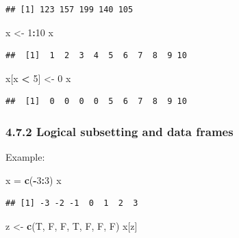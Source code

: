 \documentclass[]{article}
\newenvironment{Shaded}{\begin{snugshade}}{\end{snugshade}}
\newcommand{\KeywordTok}[1]{\textcolor[rgb]{0.13,0.29,0.53}{\textbf{#1}}}
\newcommand{\DecValTok}[1]{\textcolor[rgb]{0.00,0.00,0.81}{#1}}
\newcommand{\StringTok}[1]{\textcolor[rgb]{0.31,0.60,0.02}{#1}}
\newcommand{\OperatorTok}[1]{\textcolor[rgb]{0.81,0.36,0.00}{\textbf{#1}}}
\newcommand{\NormalTok}[1]{#1}
\begin{document}
\begin{verbatim}
## [1] 123 157 199 140 105
\end{verbatim}

\begin{Shaded}
\begin{Highlighting}[]
\NormalTok{x <-}\StringTok{ }\DecValTok{1}\OperatorTok{:}\DecValTok{10}
\NormalTok{x}
\end{Highlighting}
\end{Shaded}

\begin{verbatim}
##  [1]  1  2  3  4  5  6  7  8  9 10
\end{verbatim}

\begin{Shaded}
\begin{Highlighting}[]
\NormalTok{x[x }\OperatorTok{<}\StringTok{ }\DecValTok{5}\NormalTok{] <-}\StringTok{ }\DecValTok{0}
\NormalTok{x}
\end{Highlighting}
\end{Shaded}

\begin{verbatim}
##  [1]  0  0  0  0  5  6  7  8  9 10
\end{verbatim}

\subsubsection{4.7.2 Logical subsetting and data
frames}\label{logical-subsetting-and-data-frames}

Example:

\begin{Shaded}
\begin{Highlighting}[]
\NormalTok{x =}\StringTok{ }\KeywordTok{c}\NormalTok{(}\OperatorTok{-}\DecValTok{3}\OperatorTok{:}\DecValTok{3}\NormalTok{)}
\NormalTok{x}
\end{Highlighting}
\end{Shaded}

\begin{verbatim}
## [1] -3 -2 -1  0  1  2  3
\end{verbatim}

\begin{Shaded}
\begin{Highlighting}[]
\NormalTok{z <-}\StringTok{ }\KeywordTok{c}\NormalTok{(T, F, F, T, F, F, F)}
\NormalTok{x[z]}
\end{Highlighting}
\end{Shaded}
\end{document}
